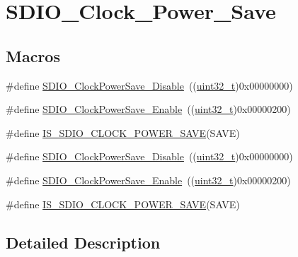 \hypertarget{group___s_d_i_o___clock___power___save}{}\section{S\+D\+I\+O\+\_\+\+Clock\+\_\+\+Power\+\_\+\+Save}
\label{group___s_d_i_o___clock___power___save}
\subsection*{Macros}
\begin{DoxyCompactItemize}
\item 
\#define \hyperlink{group___s_d_i_o___clock___power___save_ga032aa5fb2dfd7ba5dbd60a3845c82ba0}{S\+D\+I\+O\+\_\+\+Clock\+Power\+Save\+\_\+\+Disable}~((\hyperlink{_p_e___types_8h_a33594304e786b158f3fb30289278f5af}{uint32\+\_\+t})0x00000000)
\item 
\#define \hyperlink{group___s_d_i_o___clock___power___save_ga9f5b66a0044c4ff36a3eb1ec758f7ea7}{S\+D\+I\+O\+\_\+\+Clock\+Power\+Save\+\_\+\+Enable}~((\hyperlink{_p_e___types_8h_a33594304e786b158f3fb30289278f5af}{uint32\+\_\+t})0x00000200)
\item 
\#define \hyperlink{group___s_d_i_o___clock___power___save_ga41988203e5d4e35a755aa604f1876cd3}{I\+S\+\_\+\+S\+D\+I\+O\+\_\+\+C\+L\+O\+C\+K\+\_\+\+P\+O\+W\+E\+R\+\_\+\+S\+A\+VE}(S\+A\+VE)
\item 
\#define \hyperlink{group___s_d_i_o___clock___power___save_ga032aa5fb2dfd7ba5dbd60a3845c82ba0}{S\+D\+I\+O\+\_\+\+Clock\+Power\+Save\+\_\+\+Disable}~((\hyperlink{_p_e___types_8h_a33594304e786b158f3fb30289278f5af}{uint32\+\_\+t})0x00000000)
\item 
\#define \hyperlink{group___s_d_i_o___clock___power___save_ga9f5b66a0044c4ff36a3eb1ec758f7ea7}{S\+D\+I\+O\+\_\+\+Clock\+Power\+Save\+\_\+\+Enable}~((\hyperlink{_p_e___types_8h_a33594304e786b158f3fb30289278f5af}{uint32\+\_\+t})0x00000200)
\item 
\#define \hyperlink{group___s_d_i_o___clock___power___save_ga41988203e5d4e35a755aa604f1876cd3}{I\+S\+\_\+\+S\+D\+I\+O\+\_\+\+C\+L\+O\+C\+K\+\_\+\+P\+O\+W\+E\+R\+\_\+\+S\+A\+VE}(S\+A\+VE)
\end{DoxyCompactItemize}


\subsection{Detailed Description}


